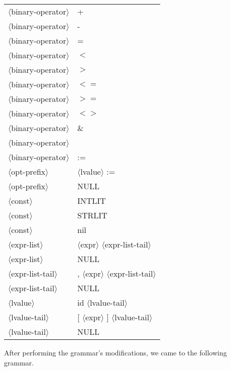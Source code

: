 \documentclass[11pt, fleqn]{article}
\newcommand{\atag}[1]{$\langle$#1$\rangle$}
\begin{document}
\begin{longtable}{l|l}
\atag{binary-operator}			&	+	\\
\atag{binary-operator}			&	-	\\
\atag{binary-operator}			&	=	\\
\atag{binary-operator}			&	$<$	\\
\atag{binary-operator}			&	$>$	\\
\atag{binary-operator}			&	$<=$	\\
\atag{binary-operator}			&	$>=$	\\
\atag{binary-operator}			&	$<>$	\\
\atag{binary-operator}			&	\&	\\
\atag{binary-operator}			&	\textbar		\\
\atag{binary-operator}			&	:=	\\
\atag{opt-prefix}				&	\atag{lvalue} :=		\\
\atag{opt-prefix}				&	NULL		\\
\atag{const}						&	INTLIT		\\
\atag{const}						&	STRLIT		\\
\atag{const}						&	nil		\\
\atag{expr-list}					&	\atag{expr} \atag{expr-list-tail}		\\
\atag{expr-list}					&	NULL		\\
\atag{expr-list-tail}			&	, \atag{expr} \atag{expr-list-tail}		\\
\atag{expr-list-tail}			&	NULL		\\
\atag{lvalue}					&	id \atag{lvalue-tail}		\\
\atag{lvalue-tail}				&	[ \atag{expr} ] \atag{lvalue-tail}		\\
\atag{lvalue-tail}				&	NULL		\\
\end{longtable}

After performing the grammar's modifications, we came to the following grammar.
\end{document}
